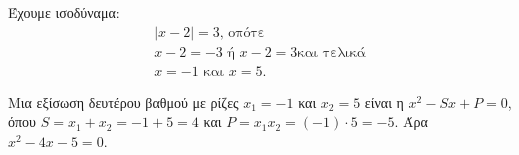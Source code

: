 
\begin{alist}
\item Έχουμε ισοδύναμα:
\begin{gather*}
|x - 2| = 3\text{, οπότε} \\
x - 2 = -3 \text{ ή } x - 2 = 3\text{και τελικά} \\
x = -1 \text{ και } x = 5.
\end{gather*}

\item Μια εξίσωση δευτέρου βαθμού με ρίζες $x_1 = -1$ και $x_2 = 5$ είναι η $x^2 - Sx + P = 0$, όπου
$S = x_1 + x_2 = -1 + 5 = 4$ και $P = x_1 x_2 = (-1) \cdot 5 = -5$. Άρα $x^2 - 4x - 5 = 0$.
\end{alist}

